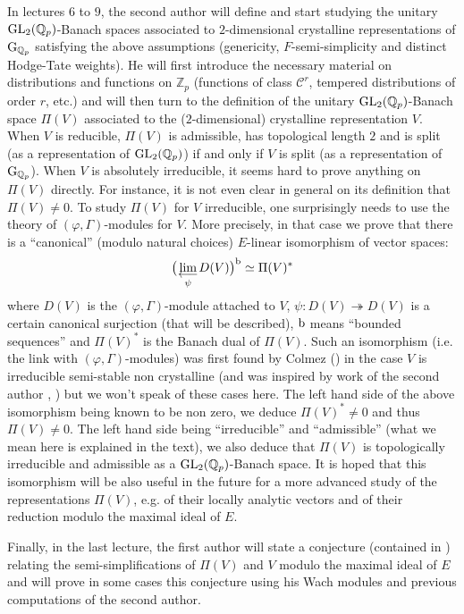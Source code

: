 \documentclass[11pt]{amsart}
\def\limproj{\mathop{\oalign{{\rm lim}\cr 
\hidewidth$\longleftarrow$\hidewidth\cr}}}
\def\Z{{\mathbb Z}_p}
\def\Q{{\mathbb Q}_p}
\def\g{{\rm G}_{\Q}}
\def\G{{\rm GL}_2(\Q)}
\begin{document}
In lectures $6$ to $9$, the second author will define and start
studying the unitary $\G$-Banach spaces associated to $2$-dimensional
crystalline representations of $\g$ satisfying the above assumptions
(genericity, $F$-semi-simplicity and distinct Hodge-Tate weights). He
will first introduce the necessary material on distributions and
functions on $\Z$ (functions of class ${\mathcal C}^r$, tempered
distributions of order $r$, etc.) and will then turn to the definition
of the unitary $\G$-Banach space $\Pi(V)$ associated to the
($2$-dimensional) crystalline representation $V$. When $V$ is
reducible, $\Pi(V)$ is admissible, has topological length $2$ and is
split (as a representation of $\G$) if and only if $V$ is split (as a
representation of $\g$). When $V$ is absolutely irreducible, it seems
hard to prove anything on $\Pi(V)$ directly. For instance, it is not
even clear in general on its definition that $\Pi(V)\ne 0$. To study
$\Pi(V)$ for $V$ irreducible, one surprisingly needs to use the theory
of $(\varphi,\Gamma)$-modules for $V$. More precisely, in that case we
prove that there is a ``canonical'' (modulo natural choices)
$E$-linear isomorphism of vector spaces: 
$$\big(\limproj_{\psi}D(V)\big)^{\rm b}\simeq \Pi(V)^*$$ 
where $D(V)$ is the $(\varphi,\Gamma)$-module attached to $V$,
$\psi:D(V)\twoheadrightarrow D(V)$ is a certain canonical surjection
(that will be described), $\rm b$ means ``bounded sequences'' and
$\Pi(V)^*$ is the Banach dual of $\Pi(V)$. Such an isomorphism
(i.e. the link with $(\varphi,\Gamma)$-modules) was first 
found by Colmez (\cite{Co3}) in the case $V$ is irreducible
semi-stable non crystalline (and was inspired by work of the second
author \cite{Br3}, \cite{Br4}) but we won't speak of these cases
here. The left hand side of the above isomorphism being known to be
non zero, we deduce $\Pi(V)^*\ne 0$ and thus $\Pi(V)\ne 0$. The left
hand side being ``irreducible'' and ``admissible'' (what we mean here
is explained in the text), we also deduce that $\Pi(V)$ is
topologically irreducible and admissible as a $\G$-Banach space. It is
hoped that this isomorphism will be also useful in the future for a
more advanced study of the representations $\Pi(V)$, e.g. of their
locally analytic vectors and of their reduction modulo the maximal
ideal of $E$.

 
Finally, in the last lecture, the first author will state a conjecture
(contained in \cite{Br2}) relating the semi-simplifications of
$\Pi(V)$ and $V$ modulo the maximal ideal of $E$ and will prove in
some cases this conjecture using his Wach modules and previous
computations of the second author.
\end{document}
